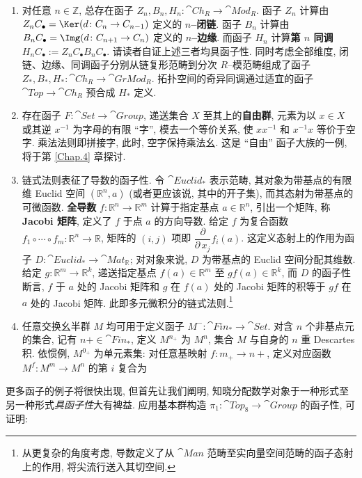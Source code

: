 \begin{example}
\begin{enumerate}[label=(\roman*)]
        \item 对任意 \(n\in\mathbb Z\), 总存在函子 \(Z_n,B_n,H_n\colon\cat{Ch}_R\to\cat{Mod}_R\). 函子 \(Z_n\) 计算由 \(Z_nC_\bullet=\Ker(d\colon C_n\to C_{n-1})\) 定义的 \textbf{\(n\)--闭链}. 函子 \(B_n\) 计算由 \(B_n C_\bullet=\Img(d\colon C_{n+1}\to C_n)\) 定义的 \textbf{\(n\)--边缘}. 而函子 \(H_n\) 计算\textbf{第 \(n\) 同调} \(H_nC_\bullet := Z_nC_\bullet B_nC_\bullet\). 请读者自证上述三者均具函子性. 同时考虑全部维度, 闭链、边缘、同调函子分别从链复形范畴到分次 \(R\)--模范畴组成了函子 \(Z_*,B_*,H_*\colon\cat{Ch}_R\to\cat{GrMod}_R\). 拓扑空间的奇异同调通过适宜的函子 \(\cat{Top}\to\cat{Ch}_R\) 预合成 \(H_*\) 定义.
        \item 存在函子 \(F\colon\cat{Set}\to\cat{Group}\), 递送集合 \(X\) 至其上的\textbf{自由群}, 元素为以 \(x\in X\) 或其逆 \(x^{-1}\) 为字母的有限 ``字'', 模去一个等价关系, 使 \(xx^{-1}\) 和 \(x^{-1}x\) 等价于空字. 乘法法则即拼接字, 此时, 空字保持乘法幺. 这是 ``自由'' 函子大族的一例, 将于第 \ref{Chap.4} 章探讨.
        \item 链式法则表征了导数的函子性. 令 \(\cat{Euclid}_*\) 表示范畴, 其对象为带基点的有限维 Euclid 空间 \((\mathbb R^n,a)\) (或者更应该说, 其中的开子集), 而其态射为带基点的可微函数. \textbf{全导数} \(f\colon\mathbb R^n\to\mathbb R^m\) 计算于指定基点 \(a\in\mathbb R^n\), 引出一个矩阵, 称 \textbf{Jacobi 矩阵}, 定义了 \(f\) 于点 \(a\) 的方向导数. 给定 \(f\) 为复合函数 \(f_1\circ\cdots\circ f_m\colon \mathbb R^n\to\mathbb R\), 矩阵的 \((i,j)\) 项即 \(\dfrac{\partial}{\partial\,x_j}f_i(a)\). 这定义态射上的作用为函子 \(D\colon\cat{Euclid}_*\to\cat{Mat}_{\mathbb R}\); 对对象来说, \(D\) 为带基点的 Euclid 空间分配其维数. 给定 \(g\colon\mathbb R^m\to\mathbb R^k\), 递送指定基点 \(f(a)\in\mathbb R^m\) 至 \(gf(a)\in\mathbb R^k\), 而 \(D\) 的函子性断言, \(f\) 于 \(a\) 处的 Jacobi 矩阵和 \(g\) 在 \(f(a)\) 处的 Jacobi 矩阵的积等于 \(gf\) 在 \(a\) 处的 Jacobi 矩阵. 此即多元微积分的链式法则.\footnote{从更复杂的角度考虑, 导数定义了从 \(\cat{Man}\) 范畴至实向量空间范畴的函子态射上的作用, 将尖流行送入其切空间.}
        \item 任意交换幺半群 \(M\) 均可用于定义函子 \(M^-\colon\cat{Fin}_*\to\cat{Set}\). 对含 \(n\) 个非基点元的集合, 记有 \(n+\in\cat{Fin}_*\), 定义 \(M^{n_+}\) 为 \(M^n\), 集合 \(M\) 与自身的 \(n\) 重 Descartes 积. 依惯例, \(M^{0_+}\) 为单元素集: 对任意基映射 \(f\colon m_+\to n+\), 定义对应函数 \(M^f\colon M^m\to M^n\) 的第 \(i\) 复合为
    \end{enumerate}
\end{example}
\par 更多函子的例子将很快出现, 但首先让我们阐明, 知晓分配数学对象于一种形式至另一种形式\textit{具函子性}大有裨益. 应用基本群构造 \(\pi_1\colon\cat{Top}_8\to\cat{Group}\) 的函子性, 可证明:
